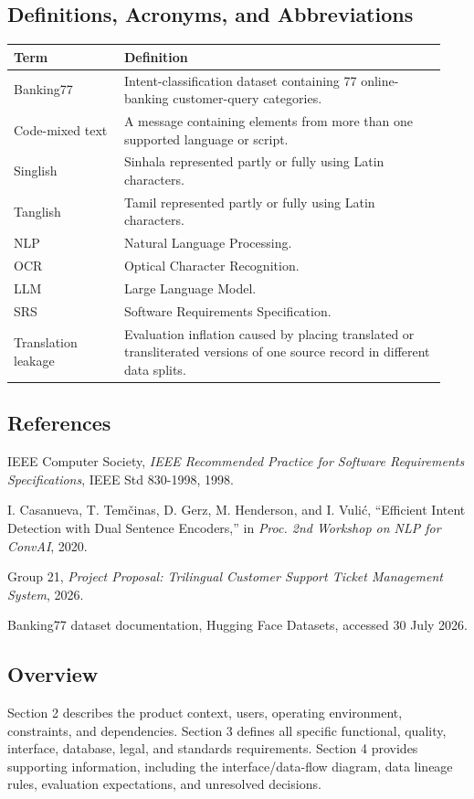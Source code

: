 \documentclass[10pt,letterpaper]{article}
\newenvironment{templatebody}{\par\justifying\setlength{\emergencystretch}{3em}}{\par}
\begin{document}
\begin{templatebody}
\subsection{Definitions, Acronyms, and Abbreviations}
\begin{longtable}{p{0.24\linewidth}p{0.70\linewidth}}
\toprule
\textbf{Term} & \textbf{Definition}\\
\midrule
Banking77 & Intent-classification dataset containing 77 online-banking customer-query categories.\\
Code-mixed text & A message containing elements from more than one supported language or script.\\
Singlish & Sinhala represented partly or fully using Latin characters.\\
Tanglish & Tamil represented partly or fully using Latin characters.\\
NLP & Natural Language Processing.\\
OCR & Optical Character Recognition.\\
LLM & Large Language Model.\\
SRS & Software Requirements Specification.\\
Translation leakage & Evaluation inflation caused by placing translated or transliterated versions of one source record in different data splits.\\
\bottomrule
\end{longtable}

\subsection{References}
\begin{enumerate}[label={[\arabic*]}]
    \item IEEE Computer Society, \textit{IEEE Recommended Practice for Software Requirements Specifications}, IEEE Std 830-1998, 1998.
    \item I. Casanueva, T. Tem\v{c}inas, D. Gerz, M. Henderson, and I. Vuli\'c, ``Efficient Intent Detection with Dual Sentence Encoders,'' in \textit{Proc. 2nd Workshop on NLP for ConvAI}, 2020.
    \item Group 21, \textit{Project Proposal: Trilingual Customer Support Ticket Management System}, 2026.
    \item Banking77 dataset documentation, Hugging Face Datasets, accessed 30 July 2026.
\end{enumerate}

\subsection{Overview}
Section 2 describes the product context, users, operating environment, constraints, and dependencies. Section 3 defines all specific functional, quality, interface, database, legal, and standards requirements. Section 4 provides supporting information, including the interface/data-flow diagram, data lineage rules, evaluation expectations, and unresolved decisions.


\end{templatebody}
\end{document}
